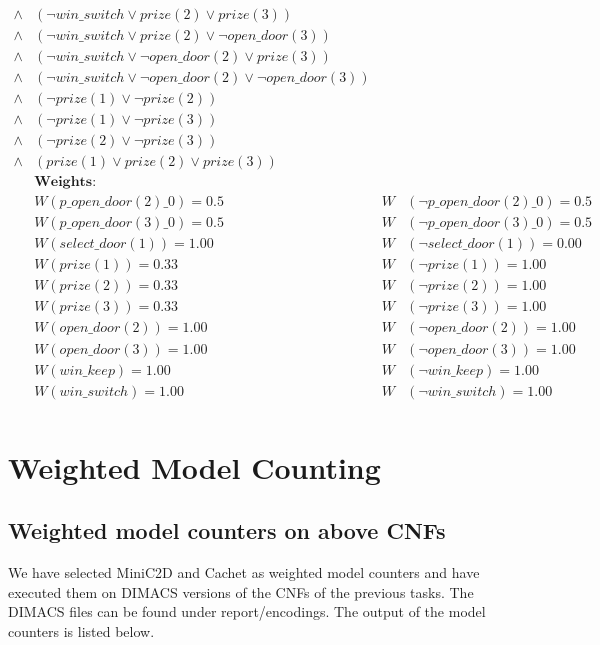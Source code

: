 \begin{align*}
    \land & (\neg win\_switch \lor prize(2) \lor prize(3))                            \\
    \land & (\neg win\_switch \lor prize(2) \lor \neg open\_door(3))                  \\
    \land & (\neg win\_switch \lor \neg open\_door(2) \lor prize(3))                  \\
    \land & (\neg win\_switch \lor \neg open\_door(2) \lor \neg open\_door(3))        \\
    \land & (\neg prize(1) \lor \neg prize(2))                                        \\
    \land & (\neg prize(1) \lor \neg prize(3))                                        \\
    \land & (\neg prize(2) \lor \neg prize(3))                                        \\
    \land & (prize(1) \lor prize(2) \lor prize(3))\\
    & \textbf{Weights:}             \\
    & W(p\_open\_door(2)\_0) = 0.5 & W &(\neg p\_open\_door(2)\_0) = 0.5 \\
    & W(p\_open\_door(3)\_0) = 0.5 & W &(\neg p\_open\_door(3)\_0) = 0.5 \\
    & W(select\_door(1)) = 1.00    & W &(\neg select\_door(1)) = 0.00    \\
    & W(prize(1)) = 0.33           & W &(\neg prize(1)) = 1.00           \\
    & W(prize(2)) = 0.33           & W &(\neg prize(2)) = 1.00           \\
    & W(prize(3)) = 0.33           & W &(\neg prize(3)) = 1.00           \\
    & W(open\_door(2)) = 1.00      & W &(\neg open\_door(2)) = 1.00      \\
    & W(open\_door(3)) = 1.00      & W &(\neg open\_door(3)) = 1.00      \\
    & W(win\_keep) = 1.00          & W &(\neg win\_keep) = 1.00          \\
    & W(win\_switch) = 1.00        & W &(\neg win\_switch) = 1.00        \\
\end{align*}


\section{Weighted Model Counting}
\subsection{Weighted model counters on above CNFs}
We have selected MiniC2D and Cachet as weighted model counters and have executed them on DIMACS versions of the CNFs of the previous tasks. The DIMACS files can be found under report/encodings.
The output of the model counters is listed below.

